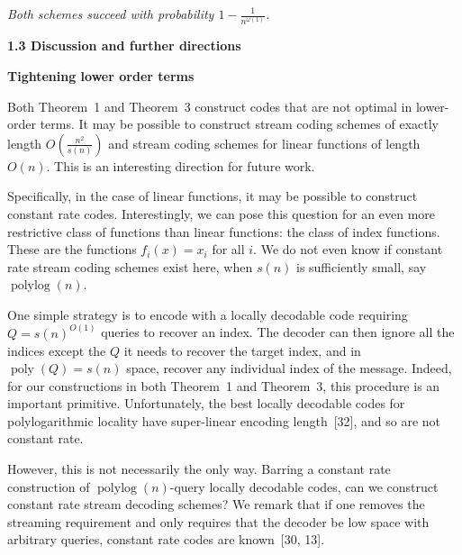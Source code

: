 \documentclass[10pt,a4paper]{article}
\begin{document}
\emph{Both schemes succeed with probability $1-\frac{1}{n^{\omega(1)}}$.}\par







\par\medskip\noindent\textbf{
1.3 Discussion and further directions}\par




\par\medskip\noindent\textbf{Tightening lower order terms}\par




Both Theorem 1 and Theorem 3 construct codes that are not optimal in lower-order terms. It may be possible to construct stream coding schemes of exactly length $O\left(\frac{n^{2}}{s(n)}\right)$ and stream coding schemes for linear functions of length $O(n)$. This is an interesting direction for future work.\par




Specifically, in the case of linear functions, it may be possible to construct constant rate codes. Interestingly, we can pose this question for an even more restrictive class of functions than linear functions: the class of index functions. These are the functions $f_{i}(x)=x_{i}$ for all $i$. We do not even know if constant rate stream coding schemes exist here, when $s(n)$ is sufficiently small, say $\operatorname{polylog}(n)$.\par




One simple strategy is to encode with a locally decodable code requiring $Q=s(n)^{O(1)}$ queries to recover an index. The decoder can then ignore all the indices except the $Q$ it needs to recover the target index, and in $\operatorname{poly}(Q)=s(n)$ space, recover any individual index of the message. Indeed, for our constructions in both Theorem 1 and Theorem 3, this procedure is an important primitive. Unfortunately, the best locally decodable codes for polylogarithmic locality have super-linear encoding length [32], and so are not constant rate.\par




However, this is not necessarily the only way. Barring a constant rate construction of $\operatorname{polylog}(n)$-query locally decodable codes, can we construct constant rate stream decoding schemes? We remark that if one removes the streaming requirement and only requires that the decoder be low space with arbitrary queries, constant rate codes are known [30, 13].\par
\end{document}
